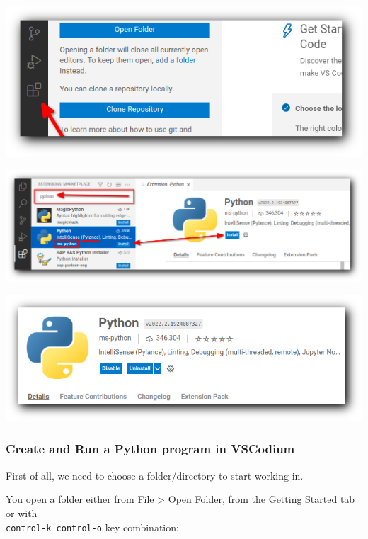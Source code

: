 \documentclass[12pt,a4paper]{article}
\newcommand{\code}[1]{%
	\colorbox{backcolour}{\lstinline{#1}}%
}
\begin{document}
\begin{center}
	\includegraphics[width=.9\textwidth]{shots/installation/vscodium-first-open.png}

	\includegraphics[width=.9\textwidth]{shots/installation/vscodium-extention.png}

	\includegraphics[width=.9\textwidth]{shots/installation/vscodium-extention-installed.png}
\end{center}
\subsubsection{Create and Run a Python program in VSCodium}

First of all, we need to choose a folder/directory to start working in.

You open a folder either from \textsf{File > Open Folder},
from the \textsf{Getting Started} tab or with \\
\code{control-k control-o} key combination:
\end{document}
